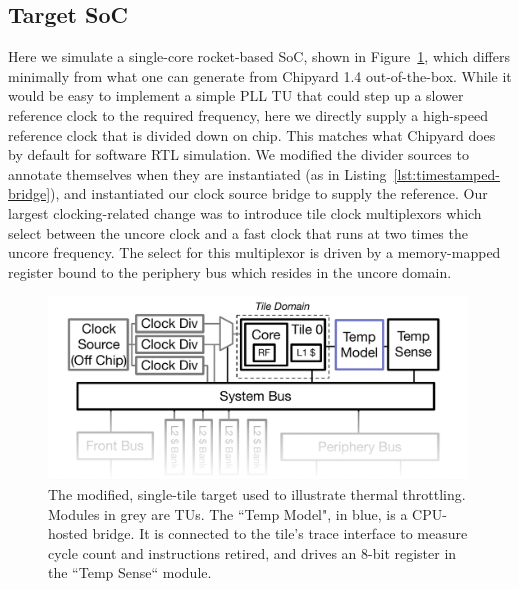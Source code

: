 \subsection{Target SoC}
Here we simulate a single-core rocket-based SoC, shown in
Figure~\ref{fig:pdes-demo-target}, which differs minimally from what one can
generate from Chipyard 1.4 out-of-the-box. While it would be easy to implement
a simple PLL TU that could step up a slower reference clock to the required
frequency, here we directly supply a high-speed reference clock that is
divided down on chip. This matches what Chipyard does by default for
software RTL simulation. We modified the divider sources to
annotate themselves when they are instantiated (as in
Listing~\ref{lst:timestamped-bridge}), and instantiated our clock source bridge
to supply the reference. Our largest clocking-related change was to introduce tile clock multiplexors which select
between the uncore clock and a fast clock that runs at two times the uncore frequency. The select for this multiplexor is driven
by a memory-mapped register bound to the periphery bus which resides in the uncore domain.

\begin{figure}
    \centering
    \includegraphics[width=0.99\textwidth]{figures/pdes-demo-target.pdf}
    \caption{The modified, single-tile target used to illustrate thermal throttling. Modules in grey are
    TUs. The ``Temp Model", in blue, is a CPU-hosted bridge. It is connected to the tile's trace interface
    to measure cycle count and instructions retired, and drives an 8-bit register in the ``Temp Sense`` module.}
    \label{fig:pdes-demo-target}
\end{figure}

